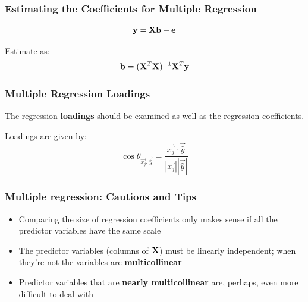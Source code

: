\documentclass{beamer}
\begin{document}
\begin{frame}
  \frametitle{Estimating the Coefficients for Multiple Regression}


$$  
\mathbf{y} = \mathbf{X}\mathbf{b} + \mathbf{e}
$$
\bigskip

Estimate  as:
$$
\mathbf{b} = (\mathbf{X}^T \mathbf{X})^{-1}\mathbf{X}^T\mathbf{y}
$$

\end{frame}
\begin{frame}
  \frametitle{Multiple Regression Loadings}


The regression \textbf{loadings} should be examined as well as the regression coefficients. 

\begin{center}
\end{center}

Loadings are given by:
		\[
		\cos \theta_{\vec{x_j},\vec{\widehat{y}}} = \frac{\vec{x_j} \cdot \vec{\widehat{y}}}{|\vec{x_j}||\vec{\widehat{y}}|}
		\]
		
		
\end{frame}




\begin{frame}
  \frametitle{Multiple regression: Cautions and Tips}


\begin{itemize}
    \item Comparing the size of regression coefficients only makes sense if all the predictor variables have the same scale
	\item The predictor variables  (columns of $\mathbf{X}$) must be linearly independent; when they're not the variables are \textbf{multicollinear}
	\item Predictor variables that are \textbf{nearly multicollinear} are, perhaps, even more difficult to deal with
\end{itemize}

\end{frame}

\end{document}
